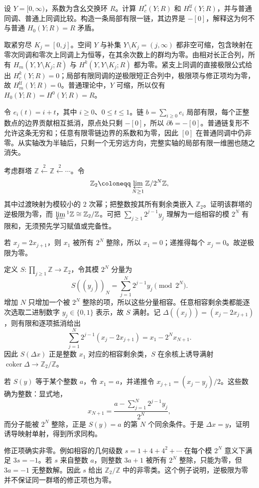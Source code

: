 \begin{exercise}\label{g2:ex:ray-support-theories}
	设 \(Y=[0,\infty)\)，系数为含幺交换环 \(R\)。计算 \(H_c^*(Y;R)\) 和 \(H_*^{\mathrm{lf}}(Y;R)\)，并与普通同调、普通上同调比较。构造一条局部有限一链，其边界是 \(-[0]\)，解释这为何不与普通 \(H_0(Y;R)=R\) 矛盾。
\end{exercise}
\begin{solution}
	取紧穷尽 \(K_j=[0,j]\)。空间 \(Y\) 与补集 \(Y\setminus K_j=(j,\infty)\) 都非空可缩，包含映射在零次同调和零次上同调上为恒等，在其余次数上的群均为零。由相对长正合列，所有 \(H_m(Y,Y\setminus K_j;R)\) 与 \(H^k(Y,Y\setminus K_j;R)\) 都为零。紧支上同调的直接极限公式给出 \(H_c^k(Y;R)=0\)；局部有限同调的逆极限短正合列中，极限项与修正项均为零，故 \(H_m^{\mathrm{lf}}(Y;R)=0\)。普通理论中，\(Y\) 可缩，所以仅有 \(H_0(Y;R)=H^0(Y;R)=R\)。

	令 \(e_i(t)=i+t\)，其中 \(i\ge0\)、\(0\le t\le1\)。链 \(b=\sum_{i\ge0}e_i\) 局部有限，每个正整数点的边界贡献相互抵消，原点处只剩 \(-[0]\)，所以 \(\partial b=-[0]\)。普通链复形不允许这条无穷和；任意有限零链边界的系数和为零，因此 \([0]\) 在普通同调中仍非零。从实轴改为半轴后，只剩一个无穷远方向，完整实轴的局部有限一维圈也随之消失。
\end{solution}

\begin{exercise}\label{g2:ex:inverse-limit-correction}
	考虑群塔 \(\mathbb Z\xleftarrow{\,2\,}\mathbb Z\xleftarrow{\,2\,}\cdots\)。令
	\[
		\mathbb Z_2\coloneqq\varprojlim_{N\ge1}\mathbb Z/2^N\mathbb Z,
	\]
	其中过渡映射为模较小的 \(2\) 次幂；把整数按其所有剩余类嵌入 \(\mathbb Z_2\)。证明该群塔的逆极限为零，而 \(\varprojlim{}^1\mathbb Z\cong\mathbb Z_2/\mathbb Z\)。可把 \(\sum_{j\ge1}2^{j-1}y_j\) 理解为一组相容的模 \(2^N\) 有限和，无须预先学习赋值或完备性。
\end{exercise}
\begin{solution}
	若 \(x_j=2x_{j+1}\)，则 \(x_1\) 被所有 \(2^N\) 整除，所以 \(x_1=0\)；递推得每个 \(x_j=0\)。故逆极限为零。

	定义 \(S:\prod_{j\ge1}\mathbb Z\to\mathbb Z_2\)，令其模 \(2^N\) 分量为
	\[
		S((y_j))_N=\sum_{j=1}^N2^{j-1}y_j\pmod{2^N}.
	\]
	增加 \(N\) 只增加一个被 \(2^N\) 整除的项，所以这些分量相容。任意相容剩余类都能逐次选取二进制数字 \(y_j\in\{0,1\}\) 表示，故 \(S\) 满射。记 \(\Delta((x_j))=(x_j-2x_{j+1})\)，则有限和逐项抵消给出
	\[
		\sum_{j=1}^N2^{j-1}(x_j-2x_{j+1})=x_1-2^Nx_{N+1}.
	\]
	因此 \(S(\Delta x)\) 正是整数 \(x_1\) 对应的相容剩余类，\(S\) 在余核上诱导满射 \(\operatorname{coker}\Delta\to\mathbb Z_2/\mathbb Z\)。

	若 \(S(y)\) 等于某个整数 \(a\)，令 \(x_1=a\)，并递推令 \(x_{j+1}=(x_j-y_j)/2\)。这些数确为整数：显式地，
	\[
		x_{N+1}=\frac{a-\sum_{j=1}^N2^{j-1}y_j}{2^N},
	\]
	而分子能被 \(2^N\) 整除，正是 \(S(y)=a\) 的第 \(N\) 个同余条件。于是 \(\Delta x=y\)，证明诱导映射单射，得到所求同构。

	修正项确实非零。例如相容的几何级数 \(s=1+4+4^2+\cdots\) 在每个模 \(2^N\) 意义下满足 \(3s=-1\)。若 \(s\) 来自整数 \(a\)，则整数 \(3a+1\) 被所有 \(2^N\) 整除，只能为零，但 \(3a=-1\) 无整数解。因此 \(s\) 给出 \(\mathbb Z_2/\mathbb Z\) 中的非零类。这个例子说明，逆极限为零并不保证同一群塔的修正项也为零。
\end{solution}

